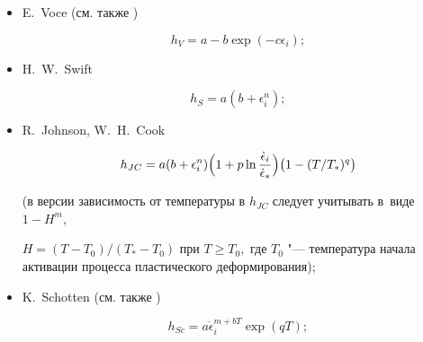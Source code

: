 \begin{itemize}

\item[--]

E.~Voce \cite{keller:bib:Voce} (см. также \cite{keller:bib:Voce-1, keller:bib:Voce-2}) %

\begin{equation}

	h_V=a-b\exp(-c \epsilon_i);

\end{equation}



\item[--] H.~W.~Swift

\cite{keller:bib:swift}

\begin{equation}

	h_S=a(b+\epsilon_i^{n});

\end{equation}



\item[--] 

R.~Johnson, W.~H.~Cook  \cite{keller:bib:john}

\begin{equation}\label{keller:eq:104}

	h_{JC}=a(b+\epsilon_i^{n})

	\Bigl(1+p\ln\frac{\dot{\epsilon}_i}{\dot{\epsilon}_{\ast}}\Bigr)

	\bigl(1-({T}/{T_{\ast}})^q\bigr)

\end{equation}

(в версии \cite[p.~65]{keller:bib:hu} зависимость от температуры в $h_{JC}$ следует учитывать в~виде $1-H^m$, 

$H=(T-T_0)/(T_{\ast}-T_0)$ при $T\geq T_0,$ где $T_0$ "--- температура начала активации процесса пластического деформирования);



\item[--] 

K.~Schotten \cite{keller:bib:Schotten} (см. также \cite{keller:bib:tong})

\begin{equation}

	h_{Sc}=a\dot{\epsilon}_i^{m+bT}\exp(qT);

\end{equation}




\end{itemize}
